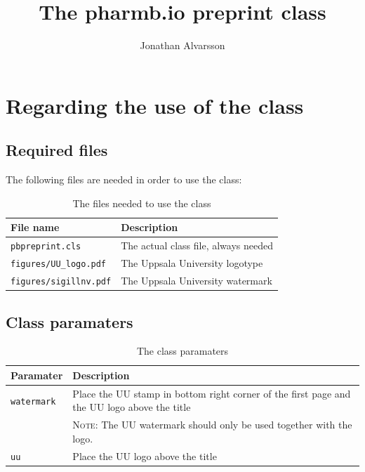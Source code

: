 \documentclass[watermark]{pbpreprint}
\begin{document}
\title{The pharm\textcolor{uured}{b.io} preprint class}
\author{Jonathan Alvarsson}
\maketitle
\begin{KeepFromToc}
   \tableofcontents
\end{KeepFromToc}
\section{Regarding the use of the class}
\subsection{Required files}
The following files are needed in order to use the class:

\begin{table}[H]
    \centering
    \caption{The files needed to use the class}
    \begin{tabular}{ll}
    \toprule
    File name & Description \\
    \midrule
    \texttt{pbpreprint.cls} & The actual class file, always needed \\
    \texttt{figures/UU\_logo.pdf} & The Uppsala University logotype \\
    \texttt{figures/sigillnv.pdf} & The Uppsala University watermark \\
    \bottomrule
    \end{tabular}
\end{table}


\subsection{Class paramaters}
\begin{table}[H]
\caption{The class paramaters}
\centering
\begin{tabular}{lp{}}
    \toprule
    Paramater & Description \\
    \midrule
    \texttt{watermark} & Place the UU stamp in bottom right corner of the first
                         page and the UU logo above the title \\ 
                       & \textsc{Note}: The UU watermark should only be used
                         together with the logo.\\
    \texttt{uu}        & Place the UU logo above the title \\
    \bottomrule
\end{tabular}
\end{table}
\end{document}

